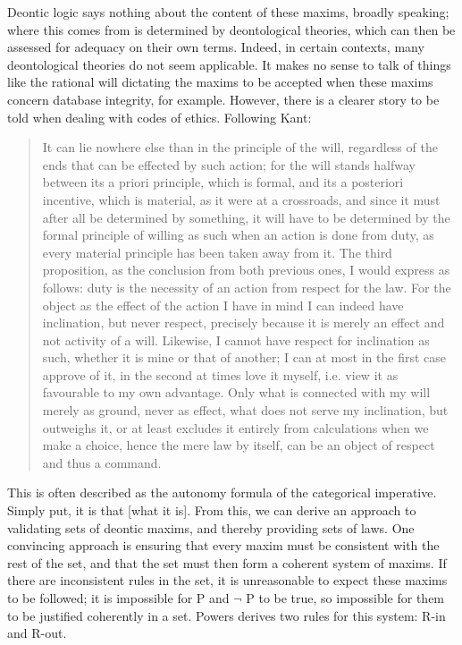 \documentclass{l4proj}
\begin{document}
Deontic logic says nothing about the content of these maxims, broadly speaking; where this comes from is determined by deontological theories, which can then be assessed for adequacy on their own terms. Indeed, in certain contexts, many deontological theories do not seem applicable. It makes no sense to talk of things like the rational will dictating the maxims to be accepted when these maxims concern database integrity, for example. However, there is a clearer story to be told when dealing with codes of ethics. Following Kant\cite{groundwork}: 

\blockquote{It can lie nowhere else than in the principle of the will, regardless of the ends that can be effected by such action; for the will stands halfway between its a priori principle, which is formal, and its a posteriori incentive, which is material, as it were at a crossroads, and since it must after all be determined by something, it will have to be determined by the formal principle of willing as such when an action is done from duty, as every material principle has been taken away from it. The third proposition, as the conclusion from both previous ones, I would express as follows: duty is the necessity of an action from respect for the law. For the object as the effect of the action I have in mind I can indeed have inclination, but never respect, precisely because it is merely an effect and not activity of a will. Likewise, I cannot have respect for inclination as such, whether it is mine or that of another; I can at most in the first case approve of it, in the second at times love it myself, i.e. view it as favourable to my own advantage. Only what is connected with my will merely as ground, never as effect, what does not serve my inclination, but outweighs it, or at least excludes it entirely from calculations when we make a choice, hence the mere law by itself, can be an object of respect and thus a command.}

This is often described as the autonomy formula of the categorical imperative. Simply put, it is that [what it is]. From this, we can derive an approach to validating sets of deontic maxims, and thereby providing sets of laws. One convincing approach is ensuring that every maxim must be consistent with the rest of the set, and that the set must then form a coherent system of maxims\cite{Powers}. If there are inconsistent rules in the set, it is unreasonable to expect these maxims to be followed; it is impossible for P and \( \neg \) P to be true, so impossible for them to be justified coherently in a set. Powers derives two rules for this system: R-in and R-out. 
\end{document}
